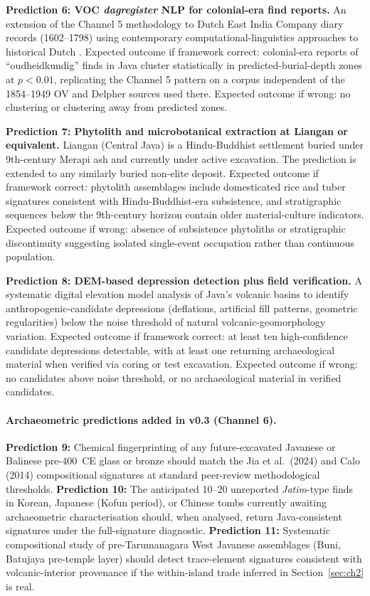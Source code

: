 \documentclass[12pt,a4paper]{article}
\begin{document}
\textbf{Prediction 6: VOC \textit{dagregister} NLP for colonial-era find reports.} An extension of the Channel 5 methodology to Dutch East India Company diary records (1602--1798) using contemporary computational-linguistics approaches to historical Dutch \citep{verberne2024}. Expected outcome if framework correct: colonial-era reports of ``oudheidkundig'' finds in Java cluster statistically in predicted-burial-depth zones at $p < 0.01$, replicating the Channel 5 pattern on a corpus independent of the 1854--1949 OV and Delpher sources used there. Expected outcome if wrong: no clustering or clustering away from predicted zones.

\textbf{Prediction 7: Phytolith and microbotanical extraction at Liangan or equivalent.} Liangan (Central Java) is a Hindu-Buddhist settlement buried under 9th-century Merapi ash and currently under active excavation. The prediction is extended to any similarly buried non-elite deposit. Expected outcome if framework correct: phytolith assemblages include domesticated rice and tuber signatures consistent with Hindu-Buddhist-era subsistence, and stratigraphic sequences below the 9th-century horizon contain older material-culture indicators. Expected outcome if wrong: absence of subsistence phytoliths or stratigraphic discontinuity suggesting isolated single-event occupation rather than continuous population.

\textbf{Prediction 8: DEM-based depression detection plus field verification.} A systematic digital elevation model analysis of Java's volcanic basins to identify anthropogenic-candidate depressions (deflations, artificial fill patterns, geometric regularities) below the noise threshold of natural volcanic-geomorphology variation. Expected outcome if framework correct: at least ten high-confidence candidate depressions detectable, with at least one returning archaeological material when verified via coring or test excavation. Expected outcome if wrong: no candidates above noise threshold, or no archaeological material in verified candidates.

\paragraph{Archaeometric predictions added in v0.3 (Channel 6).}

\textbf{Prediction 9:} Chemical fingerprinting of any future-excavated Javanese or Balinese pre-400~CE glass or bronze should match the Jia et al.\ (2024) and Calo (2014) compositional signatures at standard peer-review methodological thresholds. \textbf{Prediction 10:} The anticipated 10--20 unreported \textit{Jatim}-type finds in Korean, Japanese (Kofun period), or Chinese tombs currently awaiting archaeometric characterisation should, when analysed, return Java-consistent signatures under the full-signature diagnostic. \textbf{Prediction 11:} Systematic compositional study of pre-Tarumanagara West Javanese assemblages (Buni, Batujaya pre-temple layer) should detect trace-element signatures consistent with volcanic-interior provenance if the within-island trade inferred in Section~\ref{sec:ch2} is real.
\end{document}
